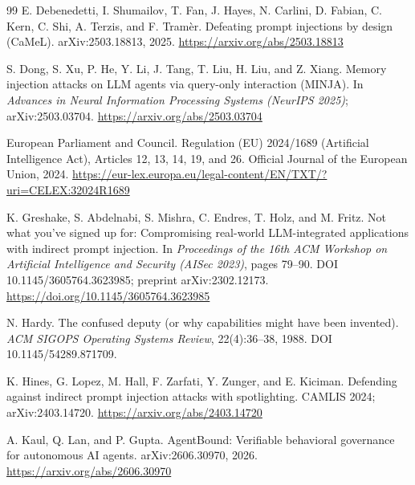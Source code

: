 \documentclass[11pt,letterpaper]{article}
\begin{document}
\begin{thebibliography}{99}
E. Debenedetti, I. Shumailov, T. Fan, J. Hayes, N. Carlini, D. Fabian, C. Kern, C. Shi, A. Terzis, and F. Tram\`{e}r.
\newblock Defeating prompt injections by design (CaMeL).
\newblock arXiv:2503.18813, 2025. \url{https://arxiv.org/abs/2503.18813}
\newblock [Preprint.]

S. Dong, S. Xu, P. He, Y. Li, J. Tang, T. Liu, H. Liu, and Z. Xiang.
\newblock Memory injection attacks on LLM agents via query-only interaction (MINJA).
\newblock In \emph{Advances in Neural Information Processing Systems (NeurIPS 2025)}; arXiv:2503.03704.
\newblock \url{https://arxiv.org/abs/2503.03704}

European Parliament and Council.
\newblock Regulation (EU) 2024/1689 (Artificial Intelligence Act), Articles 12, 13, 14, 19, and 26.
\newblock Official Journal of the European Union, 2024.
\newblock \url{https://eur-lex.europa.eu/legal-content/EN/TXT/?uri=CELEX:32024R1689}

K. Greshake, S. Abdelnabi, S. Mishra, C. Endres, T. Holz, and M. Fritz.
\newblock Not what you've signed up for: Compromising real-world LLM-integrated applications with indirect prompt injection.
\newblock In \emph{Proceedings of the 16th ACM Workshop on Artificial Intelligence and Security (AISec 2023)}, pages 79--90.
\newblock DOI 10.1145/3605764.3623985; preprint arXiv:2302.12173.
\newblock \url{https://doi.org/10.1145/3605764.3623985}

N. Hardy.
\newblock The confused deputy (or why capabilities might have been invented).
\newblock \emph{ACM SIGOPS Operating Systems Review}, 22(4):36--38, 1988. DOI 10.1145/54289.871709.

K. Hines, G. Lopez, M. Hall, F. Zarfati, Y. Zunger, and E. Kiciman.
\newblock Defending against indirect prompt injection attacks with spotlighting.
\newblock CAMLIS 2024; arXiv:2403.14720. \url{https://arxiv.org/abs/2403.14720}

A. Kaul, Q. Lan, and P. Gupta.
\newblock AgentBound: Verifiable behavioral governance for autonomous AI agents.
\newblock arXiv:2606.30970, 2026. \url{https://arxiv.org/abs/2606.30970}


\end{thebibliography}
\end{document}
